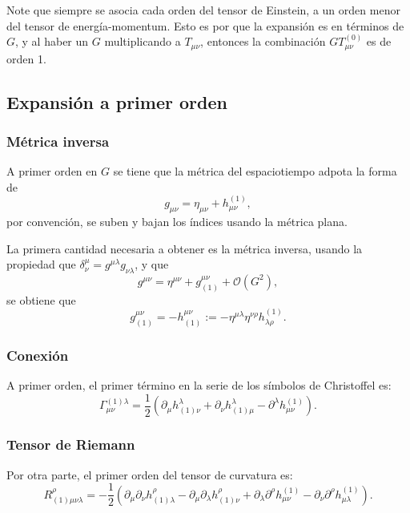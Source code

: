Note que siempre se asocia cada orden del tensor de Einstein, a un orden menor del tensor de energía-momentum. Esto es por que la expansión es en términos de $G$, y al haber un $G$ multiplicando a $T_{\mu \nu}$, entonces la combinación $GT_{\mu \nu}^{(0)}$ es de orden 1.

\subsection{Expansión a primer orden}
\subsubsection{Métrica inversa}

A primer orden en $G$ se tiene que la métrica del espaciotiempo adpota la forma de
\begin{equation}
g_{\mu \nu} = \eta_{\mu \nu} + h_{\mu \nu}^{(1)},
\end{equation}
por convención, se suben y bajan los índices usando la métrica plana.

La primera cantidad necesaria a obtener es la métrica inversa, usando la propiedad que $\delta^{\mu}_{\nu} = g^{\mu \lambda} g_{\nu \lambda}$, y que
\begin{equation}
g^{\mu \nu} = \eta^{\mu \nu} + g^{\mu \nu}_{(1)} + \mathcal{O}(G^2),
\end{equation}
se obtiene que 
\begin{equation}
g^{\mu \nu}_{(1)} = -h^{\mu \nu}_{(1)} := -\eta^{\mu \lambda} \eta^{\nu \rho} h_{\lambda \rho}^{(1)}.
\end{equation}

\subsubsection{Conexión}
A primer orden, el primer término en la serie de los símbolos de Christoffel es:
\begin{equation}
\Gamma^{(1)\lambda}_{\mu \nu} = \frac{1}{2} \left( \partial_{\mu} h^{\lambda}_{(1) \nu} + \partial_{\nu} h^{\lambda}_{(1) \mu} - \partial^{\lambda} h_{\mu \nu}^{(1)} \right).
\end{equation}

\subsubsection{Tensor de Riemann}
Por otra parte, el primer orden del tensor de curvatura es:
\begin{equation}
\label{eq:85}
R^{\rho}_{(1) \mu \nu \lambda} = -\frac{1}{2} \left( \partial_{\mu} \partial_{\nu} h^{\rho}_{(1) \lambda} - \partial_{\mu} \partial_{\lambda} h^{\rho}_{(1) \nu} + \partial_{\lambda} \partial^{\rho} h_{\mu \nu}^{(1)} - \partial_{\nu} \partial^{\rho} h_{\mu \lambda}^{(1)} \right).
\end{equation}

